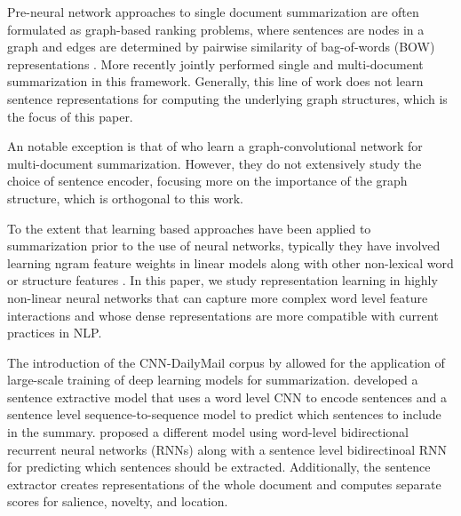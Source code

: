 

Pre-neural network
approaches to single document summarization
are often formulated as graph-based ranking problems, where
sentences are nodes in a graph and edges are determined by pairwise 
similarity of bag-of-words (BOW) representations 
\cite{erkan2004lexrank,mihalcea2005language}. 
More recently \citet{wan2010towards}
jointly performed single and multi-document summarization in this framework. 
Generally, this line of work does not learn sentence representations for 
computing the underlying graph structures, which is the focus of this paper.

An notable exception is that of
\citet{yasunaga2017graph}
who
learn a graph-convolutional network for
multi-document summarization. However, they do not extensively study the 
choice of sentence encoder, focusing more on the importance of the 
graph structure, which is orthogonal to this work.

To the extent that learning based approaches have been applied
to summarization prior to the use of neural networks, typically they have involved learning ngram feature weights 
in linear models along with other non-lexical word or 
structure features 
\cite{berg2011jointly,sipos2012large,durrett2016learning}.
In this paper, we study representation learning in highly non-linear
neural networks that can capture more complex word level feature interactions
and whose dense representations are more compatible with current practices
in NLP.

The introduction of the CNN-DailyMail corpus by \cite{nips15_hermann}
allowed for the application of large-scale training of deep learning models for summarization.
\citet{cheng2016neural} %
developed a sentence extractive
model that uses a word level 
CNN to encode 
sentences and a sentence level sequence-to-sequence model to predict 
which sentences to include in the summary. \citet{nallapati2017summarunner}
proposed a different model using word-level bidirectional recurrent neural 
networks (RNNs) along with a sentence level bidirectinoal RNN for 
predicting which sentences should be extracted. 
Additionally, the sentence
extractor creates representations of the whole document and computes 
separate scores for salience, novelty, and location.

